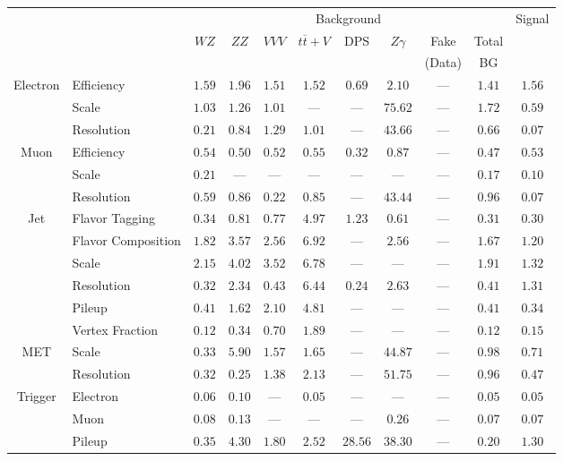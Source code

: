 \small\renewcommand{\tabcolsep}{4pt}
\begin{tabular}{|cl||ccccccc|c||c|}
\hline
 & & \multicolumn{8}{c||}{Background} & Signal \\ 
 & & $WZ$ & $ZZ$ & $VVV$ & $t\overline{t}+V$ & DPS & $Z\gamma$ & Fake & Total & \\ 
 & & &  &  &  &  &  & (Data) & BG & \\ 
\hline\hline
\multirow{3}{*}{Electron}
& Efficiency  & $ 1.59$  & $ 1.96$  & $ 1.51$  & $ 1.52$  & $ 0.69$  & $ 2.10$  & ---  & $ 1.41$  & $ 1.56$ \\ 
\cline{2-11}
& Scale  & $ 1.03$  & $ 1.26$  & $ 1.01$  & ---  & ---  & $ 75.62$  & ---  & $ 1.72$  & $ 0.59$ \\ 
\cline{2-11}
& Resolution & $0.21$& $0.84$& $1.29$& $1.01$&  --- & $43.66$&  --- & $0.66$& $0.07$\\ 
\hline
\multirow{3}{*}{Muon}
& Efficiency & $0.54$& $0.50$& $0.52$& $0.55$& $0.32$& $0.87$&  --- & $0.47$& $0.53$\\ 
\cline{2-11}
& Scale & $0.21$&  --- &  --- &  --- &  --- &  --- &  --- & $0.17$& $0.10$\\ 
\cline{2-11}
& Resolution  & $ 0.59$  & $ 0.86$  & $ 0.22$  & $ 0.85$  & ---  & $ 43.44$  & ---  & $ 0.96$  & $ 0.07$ \\ 
\hline
\multirow{6}{*}{Jet}
& Flavor Tagging  & $ 0.34$  & $ 0.81$  & $ 0.77$  & $ 4.97$  & $ 1.23$  & $ 0.61$  & ---  & $ 0.31$  & $ 0.30$ \\ 
\cline{2-11}
& Flavor Composition  & $ 1.82$  & $ 3.57$  & $ 2.56$  & $ 6.92$  & ---  & $ 2.56$  & ---  & $ 1.67$  & $ 1.20$ \\ 
\cline{2-11}
& Scale  & $ 2.15$  & $ 4.02$  & $ 3.52$  & $ 6.78$  & ---  & ---  & ---  & $ 1.91$  & $ 1.32$ \\ 
\cline{2-11}
& Resolution & $0.32$& $2.34$& $0.43$& $6.44$& $0.24$& $2.63$&  --- & $0.41$& $1.31$\\ 
\cline{2-11}
& Pileup  & $ 0.41$  & $ 1.62$  & $ 2.10$  & $ 4.81$  & ---  & ---  & ---  & $ 0.41$  & $ 0.34$ \\ 
\cline{2-11}
& Vertex Fraction & $0.12$& $0.34$& $0.70$& $1.89$&  --- &  --- &  --- & $0.12$& $0.15$\\ 
\hline
\multirow{2}{*}{MET}
& Scale & $0.33$& $5.90$& $1.57$& $1.65$&  --- & $44.87$&  --- & $0.98$& $0.71$\\ 
\cline{2-11}
& Resolution & $0.32$& $0.25$& $1.38$& $2.13$&  --- & $51.75$&  --- & $0.96$& $0.47$\\ 
\hline
\multirow{2}{*}{Trigger}
& Electron & $0.06$& $0.10$&  --- & $0.05$&  --- &  --- &  --- & $0.05$& $0.05$\\ 
\cline{2-11}
& Muon & $0.08$& $0.13$&  --- &  --- &  --- & $0.26$&  --- & $0.07$& $0.07$\\ 
\hline
& Pileup & $0.35$& $4.30$& $1.80$& $2.52$& $28.56$& $38.30$&  --- & $0.20$& $1.30$\\ 
\hline
\end{tabular}
